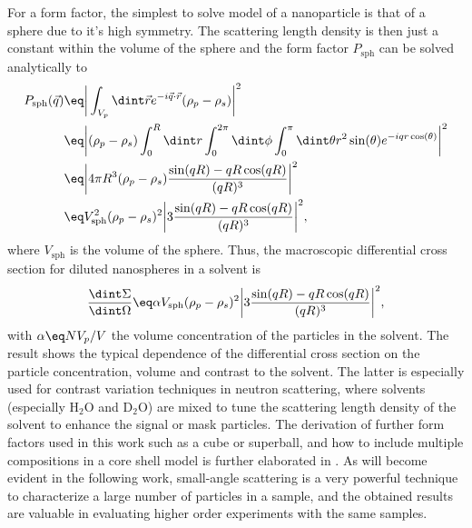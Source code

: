 \documentclass[\main/dresen_thesis.tex]{subfiles}
\begin{document}
For a form factor, the simplest to solve model of a nanoparticle is that of a sphere due to it's high symmetry.
The scattering length density is then just a constant within the volume of the sphere and the form factor $P_\mathrm{sph}$ can be solved analytically to
\begin{align}
  P_\mathrm{sph} (\vec{q})
  \eq & \bigg|\int_{V_{p}} \dint \vec{r} e^{-i\vec{q} \cdot \vec{r}} (\rho_p - \rho_s) \bigg|^2 \\
  \eq & \bigg|(\rho_p - \rho_s) \int_0^R \dint r \int_0^{2 \pi} \dint \phi \int_0^\pi \dint \theta r^2 \sin(\theta) e^{-i q r \cos(\theta)}  \bigg|^2 \\
  \eq &  \bigg| 4\pi R^3 (\rho_p - \rho_s) \frac{\sin(qR) - qR\cos(qR)}{(qR)^3}  \bigg|^2\\
  \eq & V_\mathrm{sph}^2 (\rho_p - \rho_s)^2 \bigg|3 \frac{\sin(qR) - qR\cos(qR)}{(qR)^3}  \bigg|^2,
\end{align}
where $V_\mathrm{sph}$ is the volume of the sphere.
Thus, the macroscopic differential cross section for diluted nanospheres in a solvent is
\begin{align}
  \frac{\dint \Sigma}{\dint \Omega}
  \eq \alpha V_\mathrm{sph} (\rho_p - \rho_s)^2 \bigg|3 \frac{\sin(qR) - qR\cos(qR)}{(qR)^3}  \bigg|^2,
\end{align}
with $\alpha \eq NV_p / V$ the volume concentration of the particles in the solvent.
The result shows the typical dependence of the differential cross section on the particle concentration, volume and contrast to the solvent.
The latter is especially used for contrast variation techniques in neutron scattering, where solvents (especially $\mathrm{H_2O}$ and $\mathrm{D_2O}$) are mixed to tune the scattering length density of the solvent to enhance the signal or mask particles.
The derivation of further form factors used in this work such as a cube or superball, and how to include multiple compositions in a core shell model is further elaborated in .
As will become evident in the following work, small-angle scattering is a very powerful technique to characterize a large number of particles in a sample, and the obtained results are valuable in evaluating higher order experiments with the same samples.
\end{document}
